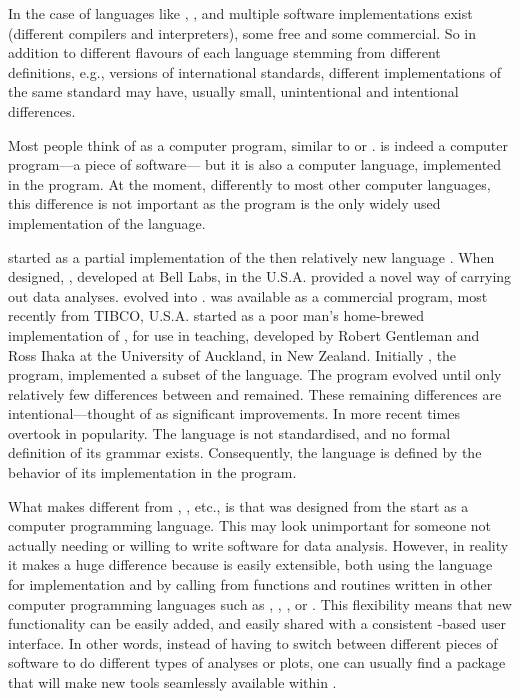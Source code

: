 \documentclass[krantz2]{krantz}\usepackage{knitr}
\begin{document}
In the case of languages like \Cpplang, \Clang, \pascallang and  multiple software implementations exist (different compilers and interpreters), some free and some commercial. So in addition to different flavours of each language stemming from different definitions, e.g., versions of international standards, different implementations of the same standard may have, usually small, unintentional and intentional differences.

Most people think
of \Rpgrm as a computer program, similar to  or . \Rpgrm is indeed a computer program---a piece of software--- but it is also a computer language, implemented in the \Rpgrm program. At the moment, differently to most other computer languages, this difference is not important as the \Rpgrm program is the only widely used implementation of the \Rlang language. 

\Rlang started as a partial implementation of the then relatively new \Slang language \autocite{Becker1984,Becker1988}. When designed, \Slang, developed at Bell Labs, in the U.S.A. provided a novel way of carrying out data analyses. \Slang evolved into \Splang \autocite{Becker1988}. \Splang was available as a commercial program, most recently from TIBCO, U.S.A. \Rlang started as a poor man's home-brewed implementation of \Slang, for use in teaching, developed by Robert Gentleman and Ross Ihaka at the University of Auckland, in New Zealand. Initially \Rpgrm, the program, implemented a subset of the \Slang language. The \Rpgrm program evolved until only relatively few differences between \Slang and \Rlang remained. These remaining differences are intentional---thought of as significant improvements. In more recent times \Rlang overtook \Splang in popularity. The \Rlang language is not standardised, and no formal definition of its grammar exists. Consequently, the \Rlang language is defined by the behavior of its implementation in the \Rpgrm program.

What makes \Rlang different from , , etc., is that \Slang was designed from the start as a computer programming language. This may look unimportant for someone not actually needing or willing to write software for data analysis. However, in reality it makes a huge difference because \Rlang is easily extensible, both using the \Rlang language for implementation and by calling from \Rlang functions and routines written in other computer programming languages such as \Clang, \Cpplang, , \pythonlang or \javalang. This flexibility means that new functionality can be easily added, and easily shared with a consistent \Rlang-based user interface. In other words, instead of having to switch between different pieces of software to do different types of analyses or plots, one can usually find a package that will make new tools seamlessly available within \Rlang.
\end{document}
